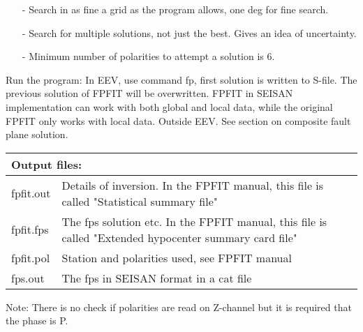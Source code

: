 \begin{itemize}
\item[-] Search in as fine a grid as the program allows, one deg for fine search.
\item[-] Search for multiple solutions, not just the best. Gives an idea of uncertainty.
\item[-] Minimum number of polarities to attempt a solution is 6.
\end{itemize}
 
Run the program: In EEV, use command fp, first solution is written to S-file. The previous solution of FPFIT will be overwritten. FPFIT in SEISAN implementation can work with both global and local data, while the original FPFIT only works with local data. 
Outside EEV. See section on composite fault plane solution.

\begin{tabular}{|lp{4cm}|lp{12cm}|}
\hline
\multicolumn{2}{|l|}{Output files:} \\
\hline
fpfit.out & Details of inversion. In the FPFIT manual, this file is called
"Statistical summary file" \\ \hline
fpfit.fps & The fps solution etc. In the FPFIT manual, this file is called 
"Extended hypocenter summary card file" \\ \hline
fpfit.pol & Station and polarities used, see FPFIT manual \\ \hline
fps.out	 & The fps in SEISAN format in a cat file\\ \hline
\end{tabular}

Note: There is no check if polarities are read on Z-channel but it is required that the phase is P. 

